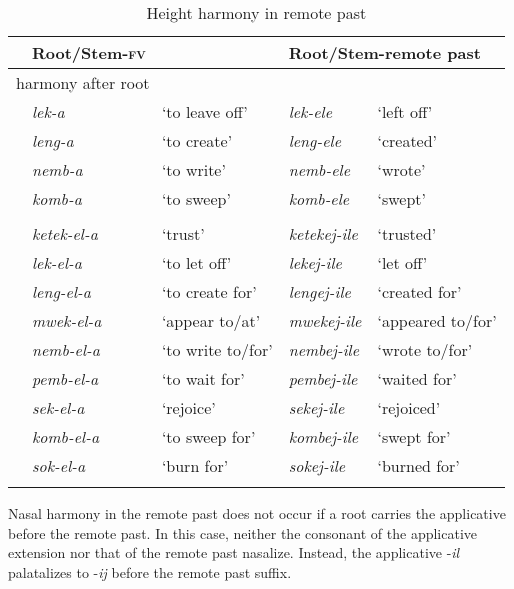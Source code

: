 \documentclass[output=paper]{langsci/langscibook}
\begin{document}
\begin{table} 
\begin{tabularx}{\textwidth}{lllll}
\lsptoprule
 & Root/Stem-\textsc{fv} &  & \multicolumn{2}{l}{Root/Stem-remote past}\\
\midrule
\multicolumn{5}{l}{harmony after root}\\
\midrule
 & \textit{lek-a} & `to leave off' & \textit{lek-ele} & `left off' \\
 & \textit{leng-a} & `to create' & \textit{leng-ele} & `created' \\
 & \textit{nemb-a} & `to write' & \textit{nemb-ele} & `wrote' \\
 & \textit{komb-a} & `to sweep' & \textit{komb-ele} & `swept' \\
\tablevspace
\multicolumn{5}{l}{no harmony after applicative}\\
\midrule
 & \textit{ketek-el-a} & `trust' & \textit{ketekej-ile} & `trusted' \\
 & \textit{lek-el-a} & `to let off' & \textit{lekej-ile} & `let off' \\
 & \textit{leng-el-a} & `to create for' & \textit{lengej-ile} & `created for' \\
 & \textit{mwek-el-a} & `appear to/at' & \textit{mwekej-ile} & `appeared to/for' \\
 & \textit{nemb-el-a} & `to write to/for' & \textit{nembej-ile} & `wrote to/for' \\
 & \textit{pemb-el-a} & `to wait for' & \textit{pembej-ile} & `waited for' \\
 & \textit{sek-el-a} & `rejoice' & \textit{sekej-ile} & `rejoiced' \\
 & \textit{komb-el-a} & `to sweep for' & \textit{kombej-ile} & `swept for' \\
 & \textit{sok-el-a} & `burn for' & \textit{sokej-ile} & `burned for' \\

\lspbottomrule
\end{tabularx}

\caption{Height harmony in remote past}
\label{tab:14.kawasha}

\end{table}




Nasal harmony in the remote past does not occur if a root carries the applicative before the remote past. In this case, neither the consonant of the applicative extension nor that of the remote past nasalize. Instead, the applicative -\textit{il} palatalizes to -\textit{ij} before the remote past suffix. 
\end{document}
